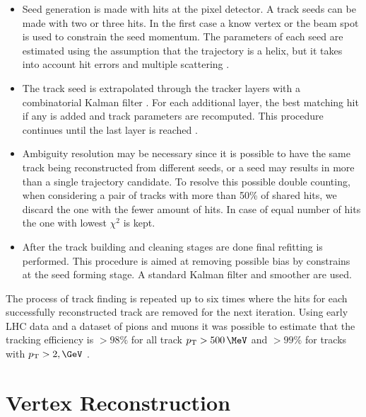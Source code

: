 \begin{itemize}
  \item Seed generation is made with hits at the pixel detector. A track seeds can be made with two or three hits. In the first case a know vertex or the beam spot is used to constrain the seed momentum. The parameters of each seed are estimated using the assumption that the trajectory is a helix, but it takes into account hit errors and multiple scattering \cite{ARTICLE:CMSTrackReconstructionSeedGeneration}.
  \item The track seed is extrapolated through the tracker layers with a combinatorial Kalman filter \cite{ARTICLE:KalmanFilteringTrackVertexFitting}. For each additional layer, the best matching hit if any is added and track parameters are recomputed. This procedure continues until the last layer is reached \cite{ARTICLE:CMSTrackReconstruction}.
  \item Ambiguity resolution may be necessary since it is possible to have the same track being reconstructed from different seeds, or a seed may results in more than a single trajectory candidate. To resolve this possible double counting, when considering a pair of tracks with more than 50\% of shared hits, we discard the one with the fewer amount of hits. In case of equal number of hits the one with lowest $\chi^2$ is kept. 
  \item After the track building and cleaning stages are done final refitting is performed. This procedure is aimed at removing possible bias by constrains at the seed forming stage. A standard Kalman filter and smoother are used.
\end{itemize}

The process of track finding is repeated up to six times where the hits for each successfully reconstructed track are removed for the next iteration. Using early \gls{LHC} data and a dataset of pions and muons it was possible to estimate that the tracking efficiency is $>98\%$ for all track $\pt > 500\,\MeV$ and $>99\%$ for tracks with $\pt > 2,\GeV$ \cite{ARTICLE:CMSMeasurmentTrackEfficiency}.

\section{Vertex Reconstruction}
\label{SECTION:EventReconstructionAndSimulation_Vertex}

